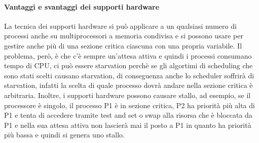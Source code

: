 \documentclass[12pt, letterpaper]{report}
\begin{document}
	\paragraph{Vantaggi e svantaggi dei supporti hardware}
	La tecnica dei supporti hardware si può applicare a un qualsiasi numero di processi anche su multiprocessori a memoria condivisa e si possono usare per gestire anche più di una sezione critica ciascuna con una propria variabile. Il problema, però, è che c'è sempre un'attesa attiva e quindi i processi consumano tempo di CPU, ci può essere starvation perchè se gli algortimi di scheduling che sono stati scelti causano starvation, di conseguenza anche lo scheduler soffrirà di starvation, infatti la scelta di quale processo dovrà andare nella sezione critica è arbitraria. Inoltre, i supporti hardware possono causare stallo, ad esempio, se il processore è singolo, il processo P1 è in sezione critica, P2 ha priorità più alta di P1 e tenta di accedere tramite test and set o swap alla risorsa che è bloccata da P1 e nella sua attesa attiva non lascierà mai il posto a P1 in quanto ha priorità più bassa e quindi si genera uno stallo.
\end{document}
